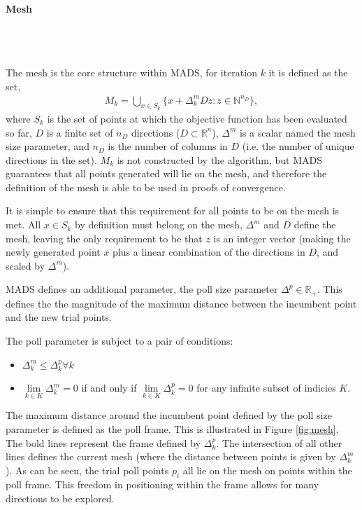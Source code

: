 \paragraph{Mesh}\\\

The mesh is the core structure within \ac{MADS}, for iteration $k$ it is defined as the set,
\begin{gather}
    M_k = \bigcup_{x\in S_k} \{x + \Delta^m_kDz:z\in \mathbb{N}^{n_D}\},\label{eqn:mads_mesh}
\end{gather}
where $S_k$ is the set of points at which the objective function has been evaluated so far, $D$ is a finite set of $n_D$ directions ($D \subset \mathbb{R}^n$), $\Delta^m$ is a scalar named the mesh size parameter, and $n_D$ is the number of columns in $D$ (i.e. the number of unique directions in the set)\cite{Audet2007MeshOptimization}. $M_k$ is not constructed by the algorithm, but \ac{MADS} guarantees that all points generated will lie on the mesh, and therefore the definition of the mesh is able to be used in proofs of convergence.

It is simple to ensure that this requirement for all points to be on the mesh is met. All $x\in S_k$ by definition must belong on the mesh, $\Delta^m$ and $D$ define the mesh, leaving the only requirement to be that $z$ is an integer vector (making the newly generated point $x$ plus a linear combination of the directions in $D$, and scaled by $\Delta^m$).

\ac{MADS} defines an additional parameter, the poll size parameter $\Delta^p\in \mathbb{R}_+$. This defines the the magnitude of the maximum distance between the incumbent point and the new trial points. 

The poll parameter is subject to a pair of conditions:
\begin{itemize}
    \item $\Delta^m_k \leq \Delta^p_k \forall k$
    \item $\lim\limits_{k\in K}\Delta^m_k=0$ if and only if $\lim\limits_{k\in K}\Delta^p_k=0$ for any infinite subset of indicies $K$.
\end{itemize}

The maximum distance around the incumbent point defined by the poll size parameter is defined as the poll frame. This is illustrated in Figure \ref{fig:mesh}. The bold lines represent the frame defined by $\Delta^p_k$. The intersection of all other lines defines the current mesh (where the distance between points is given by $\Delta^m_k$). As can be seen, the trial poll points $p_i$ all lie on the mesh on points within the poll frame. This freedom in positioning within the frame allows for many directions to be explored.

